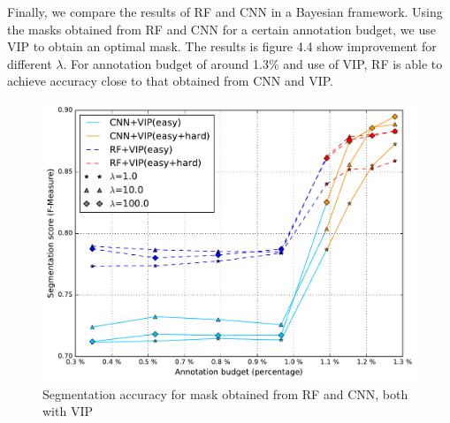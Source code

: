 Finally, we compare the results of RF and CNN in a Bayesian framework. Using the masks obtained from RF and CNN for a certain annotation budget, we use VIP to obtain an optimal mask. The results is figure 4.4 show improvement for different $\lambda$. For annotation budget of around 1.3\% and use of VIP, RF is able to achieve accuracy close to that obtained from CNN and VIP.


\begin{figure}[h!] \label{fig:cnnvip}
\centering
 \includegraphics[width=0.8\linewidth]{figures/cnn_vs_rf_vip.pdf} 
\caption{Segmentation accuracy for mask obtained from RF and CNN, both with VIP}
\end{figure}

